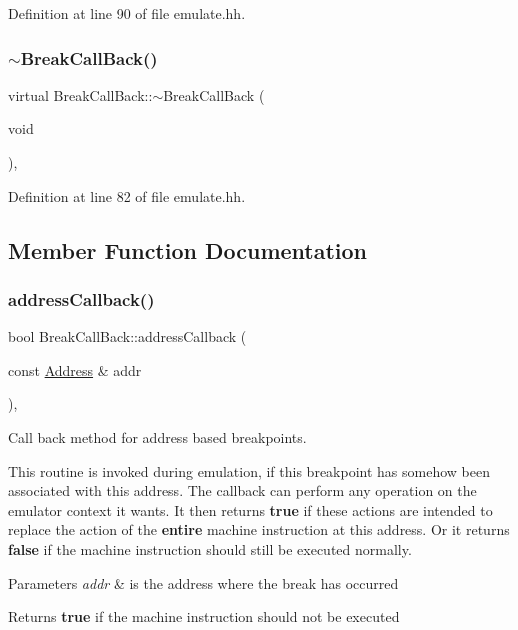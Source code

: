 Definition at line 90 of file emulate.\+hh.

\mbox{\label{class_break_call_back_ae2a936acfd580471dde37225a63a8ab2}} 
\subsubsection{\texorpdfstring{$\sim$BreakCallBack()}{~BreakCallBack()}}
{\footnotesize\ttfamily virtual Break\+Call\+Back\+::$\sim$\+Break\+Call\+Back (\begin{DoxyParamCaption}\item[{void}]{ }\end{DoxyParamCaption})\hspace{0.3cm}{\ttfamily [inline]}, {\ttfamily [virtual]}}



Definition at line 82 of file emulate.\+hh.



\subsection{Member Function Documentation}
\mbox{\label{class_break_call_back_adb97ba6b111cb9a84856c9e0f9d506f9}} 
\subsubsection{\texorpdfstring{addressCallback()}{addressCallback()}}
{\footnotesize\ttfamily bool Break\+Call\+Back\+::address\+Callback (\begin{DoxyParamCaption}\item[{const \mbox{\hyperlink{class_address}{Address}} \&}]{addr }\end{DoxyParamCaption})\hspace{0.3cm}{\ttfamily [inline]}, {\ttfamily [virtual]}}



Call back method for address based breakpoints. 

This routine is invoked during emulation, if this breakpoint has somehow been associated with this address. The callback can perform any operation on the emulator context it wants. It then returns {\bfseries{true}} if these actions are intended to replace the action of the {\bfseries{entire}} machine instruction at this address. Or it returns {\bfseries{false}} if the machine instruction should still be executed normally. 
\begin{DoxyParams}{Parameters}
{\em addr} & is the address where the break has occurred \\
\hline
\end{DoxyParams}
\begin{DoxyReturn}{Returns}
{\bfseries{true}} if the machine instruction should not be executed 
\end{DoxyReturn}


